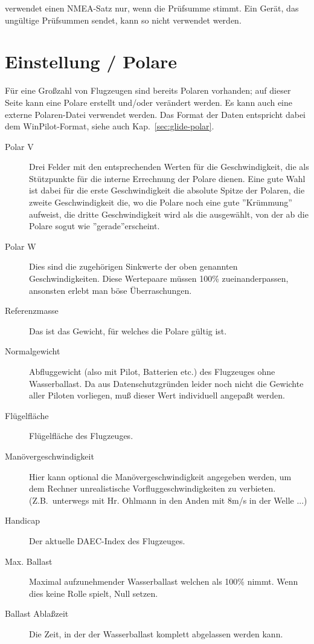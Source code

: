 \xc verwendet einen NMEA-Satz nur, wenn die Prüfsumme stimmt.  Ein
Gerät, das ungültige Prüfsummen sendet, kann so nicht verwendet werden.


\section{Einstellung / Polare}

Für eine Großzahl von Flugzeugen sind bereits Polaren vorhanden; auf dieser Seite kann eine
Polare erstellt und/oder verändert werden. Es kann auch eine externe Polaren-Datei verwendet werden.
Das Format der Daten entspricht dabei dem WinPilot-Format, siehe auch Kap.~\ref{sec:glide-polar}.
\label{conf:polar}

\begin{description}
\item[Polar V] Drei Felder mit den entsprechenden Werten für die Geschwindigkeit, die als Stützpunkte für die interne Errechnung der Polare dienen.
Eine gute Wahl ist dabei für die erste Geschwindigkeit die absolute Spitze der Polaren, die zweite Geschwindigkeit die, wo die Polare noch eine gute ''Krümmung'' aufweist, die dritte Geschwindigkeit wird als die ausgewählt, von der ab die Polare sogut wie ''gerade''erscheint.
\item[Polar W] Dies sind die zugehörigen Sinkwerte der oben genannten Geschwindigkeiten. Diese Wertepaare  müssen 100\% zueinanderpassen, ansonsten erlebt man böse Überraschungen.
\item[Referenzmasse] Das ist das Gewicht, für welches die Polare gültig ist.
\item[Normalgewicht] Abfluggewicht (also mit Pilot, Batterien etc.) des Flugzeuges ohne Wasserballast.
Da \xc aus Datenschutzgründen leider noch nicht die Gewichte aller Piloten vorliegen, muß dieser Wert individuell angepaßt werden.
\item[Flügelfläche]  Flügelfläche des Flugzeuges.
\item[Manövergeschwindigkeit] Hier kann optional die Manövergeschwindigkeit angegeben werden, um dem Rechner unrealistische Vorfluggeschwindigkeiten zu verbieten.
(Z.B.\ unterwegs mit Hr. Ohlmann in den Anden mit 8m/s in der Welle ...)
\item[Handicap]  Der aktuelle DAEC-Index des Flugzeuges.
\item[Max. Ballast] Maximal aufzunehmender Wasserballast welchen \xc als 100\% nimmt.
Wenn dies keine Rolle spielt,  Null setzen.
\item[Ballast Ablaßzeit]  Die Zeit, in der der Wasserballast komplett abgelassen werden kann.
\end{description}
